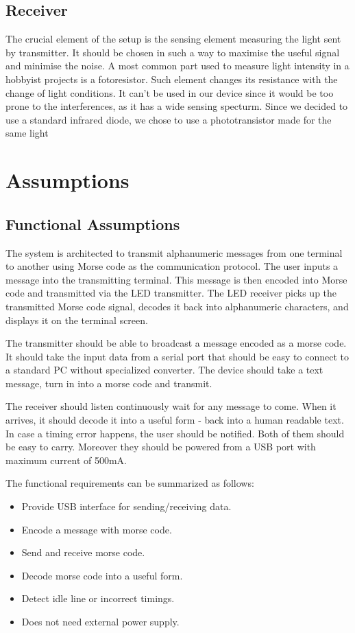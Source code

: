 \documentclass[12pt]{article}
\begin{document}
  \newpage
  \subsection{Receiver}
  The crucial element of the setup is the sensing element measuring the light sent by transmitter.
  It should be chosen in such a way to maximise the useful signal and minimise the noise.
  A most common part used to measure light intensity in a hobbyist projects is a fotoresistor. Such element changes its resistance with the change of light conditions. 
  It can't be used in our device since it would be too prone to the interferences, as it has a wide sensing specturm.
  Since we decided to use a standard infrared diode, we chose to use a phototransistor made for the same light 
	
	\section{Assumptions}
	\subsection{Functional Assumptions}
  The system is architected to transmit alphanumeric messages from one terminal to another using Morse code as the communication protocol. The user inputs a message into the transmitting terminal. This message is then encoded into Morse code and 
  transmitted via the LED transmitter. The LED receiver picks up the transmitted Morse code signal, decodes it back into alphanumeric characters, and displays it on the terminal screen.

  The transmitter should be able to broadcast a message encoded as a morse code. It should take the input data from a serial port that should be easy to connect to a standard PC without specialized converter.
  The device should take a text message, turn in into a morse code and transmit.

  The receiver should listen continuously wait for any message to come. When it arrives, it should decode it into a useful form - back into a human readable text. In case a timing error happens, the user should be notified.
  Both of them should be easy to carry. Moreover they should be powered from a USB port with maximum current of 500mA.

  The functional requirements can be summarized as follows:
  \begin{itemize}
    \item Provide USB interface for sending/receiving data.
    \item Encode a message with morse code.
    \item Send and receive morse code.
    \item Decode morse code into a useful form.
    \item Detect idle line or incorrect timings.
    \item Does not need external power supply.
  \end{itemize}
  \newpage
\end{document}
